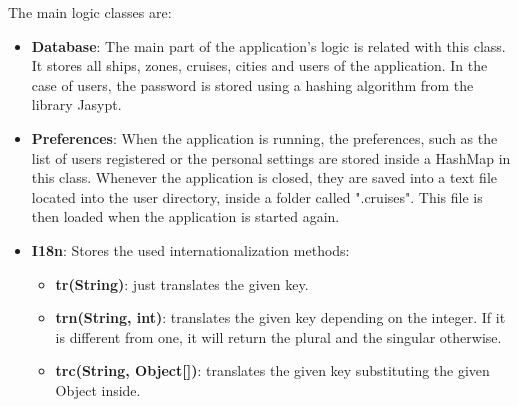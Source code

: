 \documentclass[11pt]{article}
\begin{document}
	The main logic classes are:
	\begin{itemize}
		\item \textbf{Database}: The main part of the application's logic is related with this class. It stores all ships, zones, cruises, cities and users of the application. In the case of users, the password is stored using a hashing algorithm from the library Jasypt.
		\item \textbf{Preferences}: When the application is running, the preferences, such as the list of users registered or the personal settings are stored inside a HashMap in this class. Whenever the application is closed, they are saved into a text file located into the user directory, inside a folder called ".cruises". This file is then loaded when the application is started again.
		\item \textbf{I18n}: Stores the used internationalization methods:
		\begin{itemize}
			\item \textbf{tr(String)}: just translates the given key.
			\item \textbf{trn(String, int)}: translates the given key depending on the integer. If it is different from one, it will return the plural and the singular otherwise.
			\item \textbf{trc(String, Object[])}: translates the given key substituting the given Object inside.
		\end{itemize}
   \end{itemize}
\end{document}
